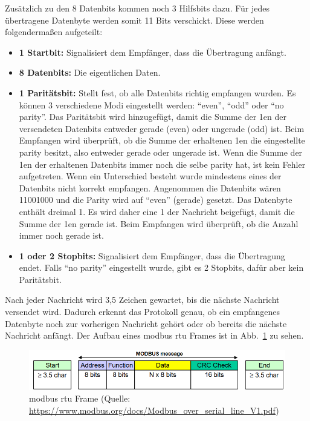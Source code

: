 Zusätzlich zu den 8 Datenbits kommen noch 3 Hilfsbits dazu. Für jedes übertragene Datenbyte werden somit 11 Bits verschickt. Diese werden folgendermaßen aufgeteilt:
\begin{itemize}
	\item \textbf{1 Startbit:} Signalisiert dem Empfänger, dass die Übertragung anfängt.
	\item \textbf{8 Datenbits:} Die eigentlichen Daten.
	\item \textbf{1 Paritätsbit:} Stellt fest, ob alle Datenbits richtig empfangen wurden. Es können 3 verschiedene Modi eingestellt werden: \enquote{even}, \enquote{odd} oder \enquote{no parity}. Das Paritätsbit wird hinzugefügt, damit die Summe der 1en der versendeten Datenbits entweder gerade (even) oder ungerade (odd) ist. Beim Empfangen wird überprüft, ob die Summe der erhaltenen 1en die eingestellte \gls{parity} besitzt, also entweder gerade oder ungerade ist. Wenn die Summe der 1en der erhaltenen Datenbits immer noch die selbe \gls{parity} hat, ist kein Fehler aufgetreten. Wenn ein Unterschied besteht wurde mindestens eines der Datenbits nicht korrekt empfangen. Angenommen die Datenbits wären 11001000 und die Parity wird auf \enquote{even} (gerade) gesetzt. Das Datenbyte enthält  dreimal 1. Es wird daher eine 1 der Nachricht beigefügt, damit die Summe der 1en gerade ist. Beim Empfangen wird überprüft, ob die Anzahl immer noch gerade ist. \cite[vgl.][]{IBM_Corporation:2023}	 
	\item \textbf{1 oder 2 Stopbits:} Signalisiert dem Empfänger, dass die Übertragung endet. Falls \enquote{no parity} eingestellt wurde, gibt es 2 Stopbits, dafür aber kein Paritätsbit.
\end{itemize}

Nach jeder Nachricht wird 3,5 Zeichen gewartet, bis die nächste Nachricht versendet wird. Dadurch erkennt das Protokoll genau, ob ein empfangenes Datenbyte noch zur vorherigen Nachricht gehört oder ob bereits die nächste Nachricht anfängt.
Der Aufbau eines \gls{modbus} \acs{rtu} Frames ist in Abb.~\ref{fig:modbus_frame} zu sehen.
\begin{figure}[H]
	\centering
	\includegraphics[width=1.0\linewidth]{Bilder/Modbus_frame}
	\caption{\gls{modbus} \acs{rtu} Frame (Quelle: \url{https://www.modbus.org/docs/Modbus_over_serial_line_V1.pdf})}
	\label{fig:modbus_frame}
\end{figure}

